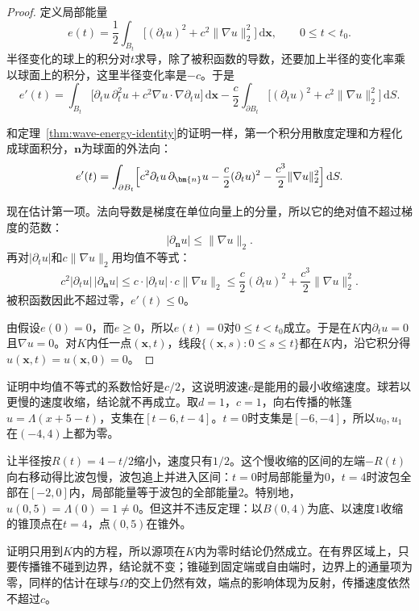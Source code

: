 \begin{proof}
定义局部能量
\[
 e(t)=\frac12\int_{B_t}\bigl[(\partial_tu)^{2}+c^{2}\lVert\nabla u\rVert_2^{2}\bigr]\,\mathrm{d}\bm{x},\qquad 0\leq t<t_0 .
\]
半径变化的球上的积分对$t$求导，除了被积函数的导数，还要加上半径的变化率乘以球面上的积分，这里半径变化率是$-c$。于是
\[
 e'(t)=\int_{B_t}\bigl[\partial_tu\,\partial_t^{2}u+c^{2}\nabla u\cdot\nabla\partial_tu\bigr]\,\mathrm{d}\bm{x}-\frac c2\int_{\partial B_t}\bigl[(\partial_tu)^{2}+c^{2}\lVert\nabla u\rVert_2^{2}\bigr]\,\mathrm{d}S .
\]

和定理~\ref{thm:wave-energy-identity}的证明一样，第一个积分用散度定理和方程化成球面积分，$\bm{n}$为球面的外法向：
\[
 e'(t)=\int_{\partial B_t}\Bigl[c^{2}\partial_tu\,\partial_{\bm{n}}u-\frac c2(\partial_tu)^{2}-\frac{c^{3}}2\lVert\nabla u\rVert_2^{2}\Bigr]\,\mathrm{d}S .
\]

现在估计第一项。法向导数是梯度在单位向量上的分量，所以它的绝对值不超过梯度的范数：
\[
 \lvert\partial_{\bm{n}}u\rvert\leq\lVert\nabla u\rVert_2 .
\]
再对$\lvert\partial_tu\rvert$和$c\lVert\nabla u\rVert_2$用均值不等式：
\[
 c^{2}\lvert\partial_tu\rvert\,\lvert\partial_{\bm{n}}u\rvert\leq c\cdot\lvert\partial_tu\rvert\cdot c\lVert\nabla u\rVert_2\leq\frac c2(\partial_tu)^{2}+\frac{c^{3}}2\lVert\nabla u\rVert_2^{2} .
\]
被积函数因此不超过零，$e'(t)\leq0$。

由假设$e(0)=0$，而$e\geq0$，所以$e(t)=0$对$0\leq t<t_0$成立。于是在$K$内$\partial_tu=0$且$\nabla u=0$。对$K$内任一点$(\bm{x},t)$，线段$\{(\bm{x},s):0\leq s\leq t\}$都在$K$内，沿它积分得$u(\bm{x},t)=u(\bm{x},0)=0$。
\end{proof}

证明中均值不等式的系数恰好是$c/2$，这说明波速$c$是能用的最小收缩速度。球若以更慢的速度收缩，结论就不再成立。取$d=1$，$c=1$，向右传播的帐篷$u=\Lambda(x+5-t)$，支集在$[t-6,t-4]$。$t=0$时支集是$[-6,-4]$，所以$u_0,u_1$在$(-4,4)$上都为零。

让半径按$R(t)=4-t/2$缩小，速度只有$1/2$。这个慢收缩的区间的左端$-R(t)$向右移动得比波包慢，波包追上并进入区间：$t=0$时局部能量为$0$，$t=4$时波包全部在$[-2,0]$内，局部能量等于波包的全部能量$2$。特别地，$u(0,5)=\Lambda(0)=1\neq0$。但这并不违反定理：以$B(0,4)$为底、以速度$1$收缩的锥顶点在$t=4$，点$(0,5)$在锥外。

证明只用到$K$内的方程，所以源项在$K$内为零时结论仍然成立。在有界区域上，只要传播锥不碰到边界，结论就不变；锥碰到固定端或自由端时，边界上的通量项为零，同样的估计在球与$\Omega$的交上仍然有效，端点的影响体现为反射，传播速度依然不超过$c$。

